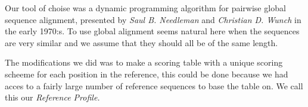 \documentclass[a4paper,11pt]{kth-mag}
\begin{document}
Our tool of choise was a dynamic programming algorithm for pairwise global sequence alignment, presented by \emph{Saul B. Needleman} and \emph{Christian D. Wunch} \cite{nw} in the early 1970:s. To use global alignment seems natural here when the sequences are very similar and we assume that they should all be of the same length.

The modifications we did was to make a scoring table with a unique scoring scheeme for each position in the reference, this could be done because we had acces to a fairly large number of reference sequences to base the table on. We call this our \emph{Reference Profile.}\\


\end{document}
